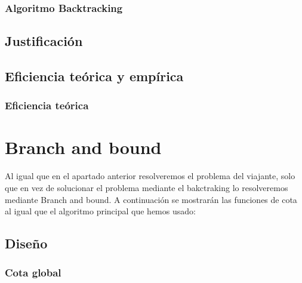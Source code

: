 \documentclass[11pt,openany]{book}
\begin{document}
\subsection{Algoritmo Backtracking}
\section{Justificación}
\section{Eficiencia teórica y empírica}
\subsection{Eficiencia teórica}


\chapter{Branch and bound}
Al igual que en el apartado anterior resolveremos el problema del viajante, solo que en vez de solucionar el problema mediante el bakctraking 
lo resolveremos mediante Branch and bound. A continuación se mostrarán las funciones de cota al igual que el algoritmo principal que hemos usado:

\section{Diseño}
\subsection{Cota global}
\end{document}
